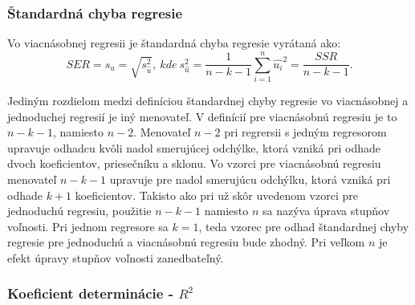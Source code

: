 \documentclass[]{tukediphc}
\begin{document}
\subsubsection{Štandardná chyba regresie}

Vo viacnásobnej regresii je štandardná chyba regresie vyrátaná ako:
\begin{equation}
    SER = s_{\hat{u}} = \sqrt{s_{\hat{u}}^2},  \ kde \  s_{\hat{u}}^2 =\frac{1}{n-k-1}\sum_{i=1}^{n}\hat{u_{i}}^2 = \frac{SSR}{n-k-1}.
\end{equation}

Jediným rozdielom medzi definíciou štandardnej chyby regresie vo viacnásobnej a jednoduchej regresií je iný menovateľ. V definícií pre viacnásobnú regresiu je to $n - k - 1$, namiesto $n - 2$. Menovateľ $n - 2$ pri regrersii s jedným regresorom upravuje odhadcu kvôli nadol smerujúcej odchýlke, ktorá vzniká pri odhade dvoch koeficientov, priesečníku a sklonu. Vo vzorci pre viacnásobnú regresiu menovateľ $n - k - 1$ upravuje pre nadol smerujúcu odchýlku, ktorá vzniká pri odhade $k + 1$ koeficientov. Takisto ako pri už skôr uvedenom vzorci pre jednoduchú regresiu, použitie $n - k - 1$ namiesto $n$ sa nazýva úprava stupňov voľnosti. Pri jednom regresore sa $k = 1$, teda vzorec pre odhad štandardnej chyby regresie pre jednoduchú a viacnásobnú regresiu bude zhodný. Pri veľkom $n$ je efekt úpravy stupňov voľnosti zanedbateľný.   

\subsubsection{Koeficient determinácie - $R^2$}












%

%

%

%

%

%


\newpage
{}
\protect\label{page:posledna}
\end{document}

